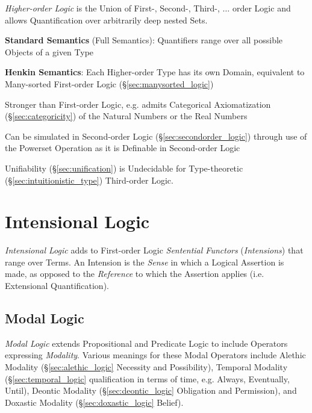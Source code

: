 \emph{Higher-order Logic} is the Union of First-, Second-, Third-,
$\ldots$ order Logic and allows Quantification over arbitrarily deep
nested Sets.

\textbf{Standard Semantics} (Full Semantics): Quantifiers range over all
possible Objects of a given Type

\textbf{Henkin Semantics}: Each Higher-order Type has its own Domain,
equivalent to Many-sorted First-order Logic
(\S\ref{sec:manysorted_logic})

Stronger than First-order Logic, e.g. admits Categorical
Axiomatization (\S\ref{sec:categoricity}) of the Natural Numbers or
the Real Numbers

Can be simulated in Second-order Logic (\S\ref{sec:secondorder_logic})
through use of the Powerset Operation as it is Definable in
Second-order Logic

Unifiability (\S\ref{sec:unification}) is Undecidable for
Type-theoretic (\S\ref{sec:intuitionistic_type}) Third-order Logic.



\section{Intensional Logic}\label{sec:intensional_logic}

\emph{Intensional Logic} adds to First-order Logic \emph{Sentential
  Functors} (\emph{Intensions}) that range over Terms. An Intension is
the \emph{Sense} in which a Logical Assertion is made, as opposed to
the \emph{Reference} to which the Assertion applies (i.e. Extensional
Quantification).



\subsection{Modal Logic}\label{sec:modal_logic}

\emph{Modal Logic} extends Propositional and Predicate Logic to
include Operators expressing \emph{Modality}. Various meanings for
these Modal Operators include Alethic Modality
(\S\ref{sec:alethic_logic} Necessity and Possibility), Temporal
Modality (\S\ref{sec:temporal_logic} qualification in terms of time,
e.g. Always, Eventually, Until), Deontic Modality
(\S\ref{sec:deontic_logic} Obligation and Permission), and Doxastic
Modality (\S\ref{sec:doxastic_logic} Belief).

